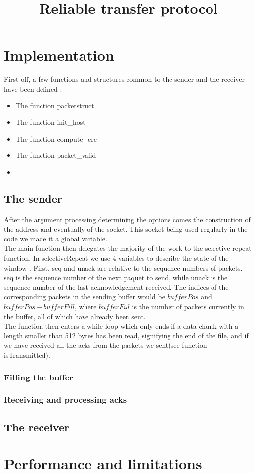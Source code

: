 \documentclass[10pt,a4paper]{article}
\title{Reliable transfer protocol}
\begin{document}
\maketitle
\section{Implementation}
First off, a few functions and structures common to the sender and the receiver have been defined : 
\begin{itemize}
\item The function packetstruct
\item The function init\_host
\item The function compute\_crc
\item The function packet\_valid
\item {}
\end{itemize}
\subsection{The sender}
After the argument processing determining the options comes the construction of the address and eventually of the socket. 
This socket being used regularly in the code we made it a global variable.\\
The main function then delegates the majority of the work to the selective repeat function. In selectiveRepeat we use 4 variables to describe the state of the window  . First, seq and unack are relative to the sequence numbers of packets. seq is the sequence number of the next paquet to send, while unack is the sequence number of the last acknowledgement received. The indices of the corresponding packets in the sending buffer would be $bufferPos$ and $bufferPos-bufferFill$, where $bufferFill$ is the number of packets currently in the buffer, all of which have already been sent.\\
The function then enters a while loop which only ends if a data chunk with a length smaller than 512 bytes has been read, signifying the end of the file, and if we have received all the acks from the packets we sent(see function isTransmitted).\\
\subsubsection{Filling the buffer}
\subsubsection{Receiving and processing acks}
\subsection{The receiver}
\section{Performance and limitations}
\end{document}
